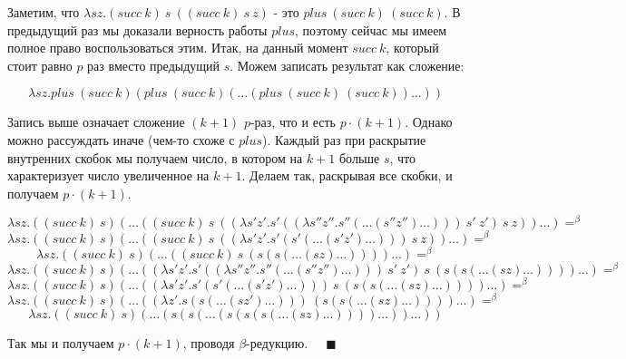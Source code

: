 \documentclass[a4paper,12pt]{article}
\theoremstyle{plain} %
\theoremstyle{definition} %
\theoremstyle{remark} %
\begin{document}
Заметим, что $\lambda sz. (succ \ k) \ s \ ((succ \ k) \ s \ z)$ - это $plus \ (succ \ k) \ (succ \ k)$. В предыдущий раз мы доказали верность работы $plus$, поэтому сейчас мы имеем полное право воспользоваться этим. 
Итак, на данный момент $succ \ k$, который стоит равно $p$ раз вместо предыдущий $s$. Можем записать результат как сложение:

$$\lambda sz. plus \ (succ \ k) (plus \ (succ \  k) (\dots (plus \ (succ \ k) \ (succ \ k)) \dots))$$

Запись выше означает сложение $(k + 1)$ $p$-раз, что и есть $p \cdot (k + 1)$. Однако можно рассуждать иначе (чем-то схоже с $plus$). Каждый раз при раскрытие внутренних скобок мы получаем число, в котором на $k+1$ больше $s$, что характеризует число увеличенное на $k+1$. Делаем так, раскрывая все скобки, и получаем $p \cdot (k + 1)$.

$$\lambda s z. ((succ \ k) \ s)(\dots((succ \ k) \ s \ ((\lambda s'z'. s'((\lambda s''z''. s''(\dots (s''z'') \dots))) \ s' \ z') \ s \ z))\dots) =^{\beta}$$
$$\lambda s z. ((succ \ k) \ s)(\dots((succ \ k) \ s \ ((\lambda s'z'. s'(s'(\dots (s'z') \dots))) \ s \ z))\dots) =^{\beta}$$
$$\lambda s z. ((succ \ k) \ s)(\dots((succ \ k) \ s \ (s(s(\dots (sz) \dots))))\dots) =^{\beta}$$
$$\lambda s z. ((succ \ k) \ s)(\dots((\lambda s'z'. s'((\lambda s''z''. s''(\dots (s''z'') \dots))) \ s' \ z') \ s \ (s(s(\dots (sz) \dots))))\dots) =^{\beta}$$
$$\lambda s z. ((succ \ k) \ s)(\dots((\lambda s'z'. s'(s'(\dots (s'z') \dots))) \ s \ (s(s(\dots (sz) \dots))))\dots) =^{\beta}$$
$$\lambda s z. ((succ \ k) \ s)(\dots((\lambda z'. s(s(\dots (sz') \dots))) \ (s(s(\dots (sz) \dots))))\dots) =^{\beta}$$
$$\lambda s z. ((succ \ k) \ s)(\dots(s(s(\dots (s(s(s(\dots (sz) \dots))))\dots)) \dots))$$

Так мы и получаем $p\cdot (k + 1)$, проводя $\beta$-редукцию. $\ \ \ \ \ \blacksquare$
\end{document}
